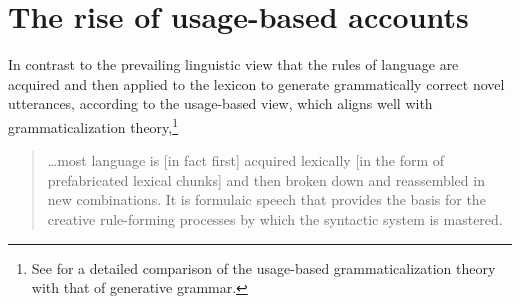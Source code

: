 \documentclass[output=paper]{langsci/langscibook}
\begin{document}
\section{The rise of usage-based accounts}

In contrast to the prevailing linguistic view that the rules of language are acquired and then applied to the lexicon to generate grammatically correct novel utterances, according to the usage-based view, which aligns well with grammaticalization theory,\footnote{See \citet{kibbee_evolution_2010} for a detailed comparison of the usage-based grammaticalization theory with that of generative grammar.}

\begin{quote}
    …most language is [in fact first] acquired lexically [in the form of prefabricated lexical chunks] and then broken down and reassembled in new combinations. It is formulaic speech that provides the basis for the creative rule-forming processes by which the syntactic system is mastered. \citep[174]{mackenzie_improvisation_2000}
\end{quote}
\end{document}
